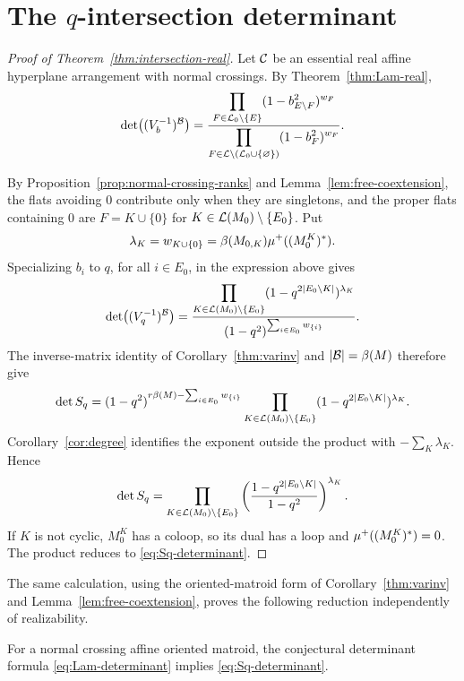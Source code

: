 \section{The \texorpdfstring{$q$}{q}-intersection determinant}\label{sec:qdet}
\begin{proof}[Proof of Theorem~\ref{thm:intersection-real}]
Let $\mathcal C$ be an essential real affine hyperplane arrangement with normal crossings.  By Theorem~\ref{thm:Lam-real},
\[
 \det\bigl((V_b^{-1})^{\mathcal B}\bigr)
 =\frac{\displaystyle\prod_{F\in\mathcal L_0\setminus\{E\}}
          (1-b_{E\setminus F}^2)^{w_F}}
        {\displaystyle\prod_{F\in\mathcal L\setminus(\mathcal L_0\cup\{\varnothing\})}
          (1-b_F^2)^{w_F}}.
\]

By Proposition~\ref{prop:normal-crossing-ranks}
and Lemma~\ref{lem:free-coextension},
the flats avoiding $0$ contribute only when they are singletons,
and the proper flats containing $0$ are $F=K\cup\{0\}$ for
$K\in\mathcal L(M_0)\setminus\{E_0\}$. Put
\[
 \lambda_K=w_{K\cup\{0\}}
       =\beta(M_{0,K})\mu^+((M_0^K)^*).
\]
Specializing $b_i$ to $q$, for all $i\in E_0$, in the expression above gives
\[
 \det\bigl((V_q^{-1})^{\mathcal B}\bigr)
 =\frac{\displaystyle\prod_{K\in\mathcal L(M_0)\setminus\{E_0\}}
          (1-q^{2|E_0\setminus K|})^{\lambda_K}}
        {(1-q^2)^{\sum_{i\in E_0}w_{\{i\}}}}.
\]
The inverse-matrix identity of Corollary~\ref{thm:varinv} and
$|\mathcal B|=\beta(M)$ therefore give
\[
 \det S_q
 =(1-q^2)^{r\beta(M)-\sum_{i\in E_0}w_{\{i\}}}
   \prod_{K\in\mathcal L(M_0)\setminus\{E_0\}}
      (1-q^{2|E_0\setminus K|})^{\lambda_K}.
\]
Corollary~\ref{cor:degree} identifies the exponent outside the product
with $-\sum_K\lambda_K$. Hence
\[
 \det S_q
 =\prod_{K\in\mathcal L(M_0)\setminus\{E_0\}}
    \left(\frac{1-q^{2|E_0\setminus K|}}{1-q^2}\right)^{\lambda_K}.
\]
If $K$ is not cyclic, $M_0^K$ has a coloop, so its dual has a loop
and $\mu^+((M_0^K)^*)=0$. The product reduces to
\eqref{eq:Sq-determinant}.
\end{proof}

The same calculation, using the oriented-matroid form of
Corollary~\ref{thm:varinv} and Lemma~\ref{lem:free-coextension},
proves the following reduction independently of realizability.

\begin{corollary}\label{cor:conjecture-reduction}
For a normal crossing affine oriented matroid, the conjectural determinant
formula \eqref{eq:Lam-determinant} implies \eqref{eq:Sq-determinant}.
\end{corollary}

